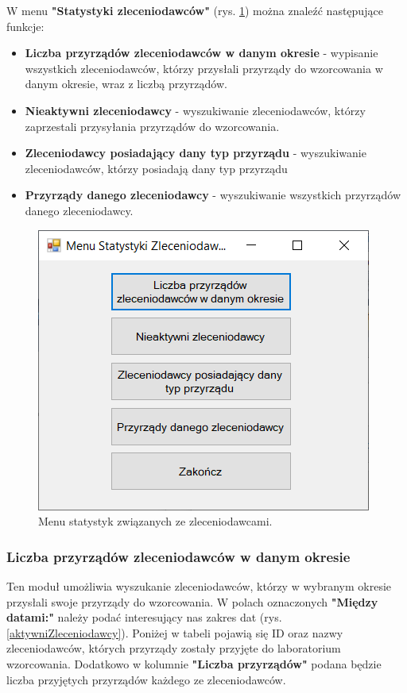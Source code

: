 W menu \textbf{"Statystyki zleceniodawców"} (rys. \ref{menuStatystykiZleceniodawcy}) można znaleźć następujące funkcje:
\begin{itemize}
	\item \textbf{Liczba przyrządów zleceniodawców w danym okresie} - wypisanie wszystkich zleceniodawców, którzy przysłali przyrządy do wzorcowania w danym okresie, wraz z liczbą przyrządów.
	\item \textbf{Nieaktywni zleceniodawcy} - wyszukiwanie zleceniodawców, którzy zaprzestali przysyłania przyrządów do wzorcowania.
	\item \textbf{Zleceniodawcy posiadający dany typ przyrządu} - wyszukiwanie zleceniodawców, którzy posiadają dany typ przyrządu
	\item \textbf{Przyrządy danego zleceniodawcy} - wyszukiwanie wszystkich przyrządów danego zleceniodawcy.
\end{itemize}

\begin{figure}[htb]
	\centering
	\includegraphics{obrazki/Wyszukiwanie/Zleceniodawcy/menu_statystyki_zleceniodawcow.png}
	\caption{Menu statystyk związanych ze zleceniodawcami.}
	\label{menuStatystykiZleceniodawcy}
\end{figure}

\subsubsection{Liczba przyrządów zleceniodawców w danym okresie}
\label{sort_zleceniodawcow}

Ten moduł umożliwia wyszukanie zleceniodawców, którzy w wybranym okresie przysłali swoje przyrządy do wzorcowania. W polach oznaczonych \textbf{"Między datami:"} należy podać interesujący nas zakres dat (rys. \ref{aktywniZleceniodawcy}). Poniżej w tabeli pojawią się ID oraz nazwy zleceniodawców, których przyrządy zostały przyjęte do laboratorium wzorcowania. Dodatkowo w kolumnie \textbf{"Liczba przyrządów"} podana będzie liczba przyjętych przyrządów każdego ze zleceniodawców.

